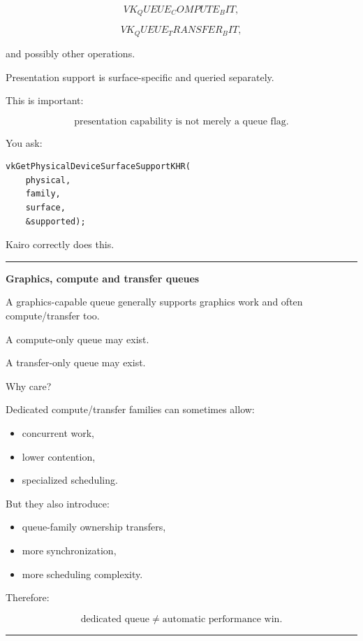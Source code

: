 \[
VK_QUEUE_COMPUTE_BIT,
\]

\[
VK_QUEUE_TRANSFER_BIT,
\]

and possibly other operations.

Presentation support is surface-specific and queried separately.

This is important:

\[
\boxed{
\text{presentation capability is not merely a queue flag}.
}
\]

You ask:

\begin{verbatim}
vkGetPhysicalDeviceSurfaceSupportKHR(
    physical,
    family,
    surface,
    &supported);
\end{verbatim}

Kairo correctly does this.

\begin{center}\rule{0.5\linewidth}{0.5pt}\end{center}

\textbf{Graphics, compute and transfer queues}

A graphics-capable queue generally supports graphics work and often compute/transfer too.

A compute-only queue may exist.

A transfer-only queue may exist.

Why care?

Dedicated compute/transfer families can sometimes allow:

\begin{itemize}
\tightlist
\item
  concurrent work,
\item
  lower contention,
\item
  specialized scheduling.
\end{itemize}

But they also introduce:

\begin{itemize}
\tightlist
\item
  queue-family ownership transfers,
\item
  more synchronization,
\item
  more scheduling complexity.
\end{itemize}

Therefore:

\[
\boxed{
\text{dedicated queue}
\neq
\text{automatic performance win}.
}
\]

\begin{center}\rule{0.5\linewidth}{0.5pt}\end{center}

